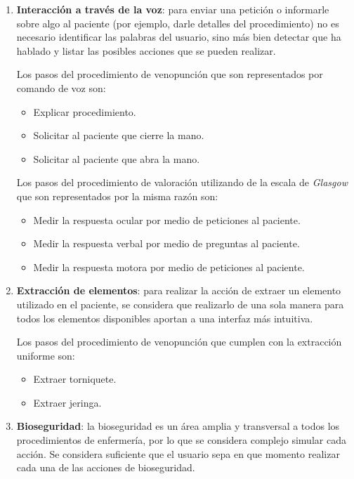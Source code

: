 \begin{enumerate}[label=\bfseries C\arabic*:]

\item \textbf{Interacción a través de la voz}: para enviar una petición o
    informarle sobre algo al paciente (por ejemplo, darle detalles del
    procedimiento) no es necesario identificar las palabras del usuario, sino
    más bien detectar que ha hablado y listar las posibles acciones que se
    pueden realizar.
    
    Los pasos del procedimiento de venopunción que son representados por 
    comando de voz son:
    
    \begin{itemize}
        \item Explicar procedimiento.
        \item Solicitar al paciente que cierre la mano.
        \item Solicitar al paciente que abra la mano.
    \end{itemize}
    
    Los pasos del procedimiento de valoración utilizando de la escala de \emph{Glasgow} 
    que son representados por la misma razón son:
    
    \begin{itemize}
        \item Medir la respuesta ocular por medio de peticiones al paciente.
        \item Medir la respuesta verbal por medio de preguntas al paciente.
        \item Medir la respuesta motora por medio de peticiones al paciente.
    \end{itemize}

\item \textbf{Extracción de elementos}: para realizar la acción de
    extraer un elemento utilizado en el paciente, se considera que realizarlo de
    una sola manera para todos los elementos disponibles aportan a una interfaz más
    intuitiva.

    Los pasos del procedimiento de venopunción que cumplen con la extracción 
    uniforme son:
    
    \begin{itemize}
        \item Extraer torniquete.
        \item Extraer jeringa.
    \end{itemize}
    
\item \textbf{Bioseguridad}: la bioseguridad es un área amplia y transversal a
    todos los procedimientos de enfermería, por lo que se considera complejo
    simular cada acción. Se considera suficiente que el usuario sepa en que momento
    realizar cada una de las acciones de bioseguridad. 
    

\end{enumerate}
